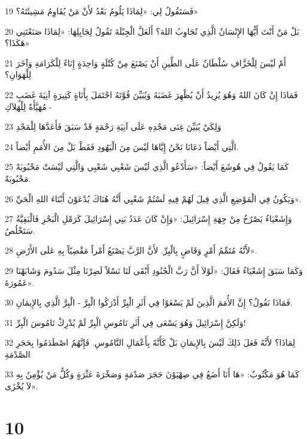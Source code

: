 \par 19 فَسَتَقُولُ لِي: «لِمَاذَا يَلُومُ بَعْدُ لأَنْ مَنْ يُقَاوِمُ مَشِيئَتَهُ؟»
\par 20 بَلْ مَنْ أَنْتَ أَيُّهَا الإِنْسَانُ الَّذِي تُجَاوِبُ اللهَ؟ أَلَعَلَّ الْجِبْلَةَ تَقُولُ لِجَابِلِهَا: «لِمَاذَا صَنَعْتَنِي هَكَذَا؟»
\par 21 أَمْ لَيْسَ لِلْخَزَّافِ سُلْطَانٌ عَلَى الطِّينِ أَنْ يَصْنَعَ مِنْ كُتْلَةٍ وَاحِدَةٍ إِنَاءً لِلْكَرَامَةِ وَآخَرَ لِلْهَوَانِ؟
\par 22 فَمَاذَا إِنْ كَانَ اللهُ وَهُوَ يُرِيدُ أَنْ يُظْهِرَ غَضَبَهُ وَيُبَيِّنَ قُوَّتَهُ احْتَمَلَ بِأَنَاةٍ كَثِيرَةٍ آنِيَةَ غَضَبٍ مُهَيَّأَةً لِلْهَلاَكِ -
\par 23 وَلِكَيْ يُبَيِّنَ غِنَى مَجْدِهِ عَلَى آنِيَةِ رَحْمَةٍ قَدْ سَبَقَ فَأَعَدَّهَا لِلْمَجْدِ
\par 24 الَّتِي أَيْضاً دَعَانَا نَحْنُ إِيَّاهَا لَيْسَ مِنَ الْيَهُودِ فَقَطْ بَلْ مِنَ الأُمَمِ أَيْضاً.
\par 25 كَمَا يَقُولُ فِي هُوشَعَ أَيْضاً: «سَأَدْعُو الَّذِي لَيْسَ شَعْبِي شَعْبِي وَالَّتِي لَيْسَتْ مَحْبُوبَةً مَحْبُوبَةً.
\par 26 وَيَكُونُ فِي الْمَوْضِعِ الَّذِي قِيلَ لَهُمْ فِيهِ لَسْتُمْ شَعْبِي أَنَّهُ هُنَاكَ يُدْعَوْنَ أَبْنَاءَ اللهِ الْحَيِّ».
\par 27 وَإِشَعْيَاءُ يَصْرُخُ مِنْ جِهَةِ إِسْرَائِيلَ: «وَإِنْ كَانَ عَدَدُ بَنِي إِسْرَائِيلَ كَرَمْلِ الْبَحْرِ فَالْبَقِيَّةُ سَتَخْلُصُ.
\par 28 لأَنَّهُ مُتَمِّمُ أَمْرٍ وَقَاضٍ بِالْبِرِّ. لأَنَّ الرَّبَّ يَصْنَعُ أَمْراً مَقْضِيّاً بِهِ عَلَى الأَرْضِ».
\par 29 وَكَمَا سَبَقَ إِشَعْيَاءُ فَقَالَ: «لَوْلاَ أَنَّ رَبَّ الْجُنُودِ أَبْقَى لَنَا نَسْلاً لَصِرْنَا مِثْلَ سَدُومَ وَشَابَهْنَا عَمُورَةَ».
\par 30 فَمَاذَا نَقُولُ؟ إِنَّ الأُمَمَ الَّذِينَ لَمْ يَسْعَوْا فِي أَثَرِ الْبِرِّ أَدْرَكُوا الْبِرَّ - الْبِرَّ الَّذِي بِالإِيمَانِ.
\par 31 وَلَكِنَّ إِسْرَائِيلَ وَهُوَ يَسْعَى فِي أَثَرِ نَامُوسِ الْبِرِّ لَمْ يُدْرِكْ نَامُوسَ الْبِرِّ!
\par 32 لِمَاذَا؟ لأَنَّهُ فَعَلَ ذَلِكَ لَيْسَ بِالإِيمَانِ بَلْ كَأَنَّهُ بِأَعْمَالِ النَّامُوسِ. فَإِنَّهُمُ اصْطَدَمُوا بِحَجَرِ الصَّدْمَةِ
\par 33 كَمَا هُوَ مَكْتُوبٌ: «هَا أَنَا أَضَعُ فِي صِهْيَوْنَ حَجَرَ صَدْمَةٍ وَصَخْرَةَ عَثْرَةٍ وَكُلُّ مَنْ يُؤْمِنُ بِهِ لاَ يُخْزَى».

\chapter{10}

